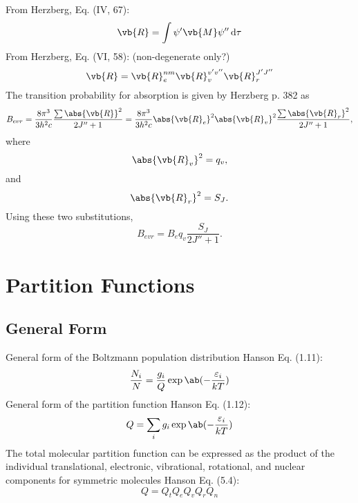 \documentclass[11pt, twoside, fleqn]{report}
\begin{document}
From Herzberg, Eq. (IV, 67):
\begin{equation*}
    \vb{R} = \int \psi'\vb{M}\psi'' \odif{\tau}
\end{equation*}
From Herzberg, Eq. (VI, 58): (non-degenerate only?)
\begin{equation*}
    \vb{R} = \vb{R}_{e}^{nm}\vb{R}_{v}^{v'v''}\vb{R}_{r}^{J'J''}
\end{equation*}
The transition probability for absorption is given by Herzberg p. 382 as
\begin{equation*}
    B_{evr} = \frac{8\pi^{3}}{3h^{2}c}\frac{\sum\abs{\vb{R}}^{2}}{2J'' + 1} = \frac{8\pi^{3}}{3h^{2}c}\abs{\vb{R}_{e}}^{2}\abs{\vb{R}_{v}}^{2}\frac{\sum\abs{\vb{R}_{r}}^{2}}{2J'' + 1},
\end{equation*}
where
\begin{equation*}
    \abs{\vb{R}_{v}}^{2} = q_{v},
\end{equation*}
and
\begin{equation*}
    \abs{\vb{R}_{r}}^{2} = S_{J}.
\end{equation*}
Using these two substitutions,
\begin{equation*}
    B_{evr} = B_{e}q_{v}\frac{S_{J}}{2J'' + 1}.
\end{equation*}

\section{Partition Functions}

\subsection{General Form}

General form of the Boltzmann population distribution Hanson Eq. (1.11):
\begin{equation*}
    \frac{N_{i}}{N} = \frac{g_{i}}{Q}\exp\ab(-\frac{\varepsilon_{i}}{kT})
\end{equation*}
General form of the partition function Hanson Eq. (1.12):
\begin{equation*}
    Q = \sum_{i} g_{i}\exp\ab(-\frac{\varepsilon_{i}}{kT})
\end{equation*}
The total molecular partition function can be expressed as the product of the individual translational, electronic, vibrational, rotational, and nuclear components for symmetric molecules Hanson Eq. (5.4):
\begin{equation*}
    Q = Q_{t}Q_{e}Q_{v}Q_{r}Q_{n}
\end{equation*}
\end{document}

